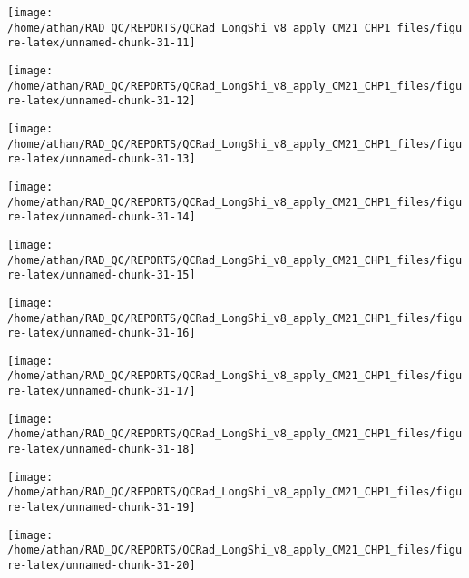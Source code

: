\documentclass[
  10pt,
  a4paper,oneside]{article}
\begin{document}
\begin{center}\texttt{[image: /home/athan/RAD\_QC/REPORTS/QCRad\_LongShi\_v8\_apply\_CM21\_CHP1\_files/figure-latex/unnamed-chunk-31-11]} \end{center}

\begin{center}\texttt{[image: /home/athan/RAD\_QC/REPORTS/QCRad\_LongShi\_v8\_apply\_CM21\_CHP1\_files/figure-latex/unnamed-chunk-31-12]} \end{center}

\begin{center}\texttt{[image: /home/athan/RAD\_QC/REPORTS/QCRad\_LongShi\_v8\_apply\_CM21\_CHP1\_files/figure-latex/unnamed-chunk-31-13]} \end{center}

\begin{center}\texttt{[image: /home/athan/RAD\_QC/REPORTS/QCRad\_LongShi\_v8\_apply\_CM21\_CHP1\_files/figure-latex/unnamed-chunk-31-14]} \end{center}

\begin{center}\texttt{[image: /home/athan/RAD\_QC/REPORTS/QCRad\_LongShi\_v8\_apply\_CM21\_CHP1\_files/figure-latex/unnamed-chunk-31-15]} \end{center}

\begin{center}\texttt{[image: /home/athan/RAD\_QC/REPORTS/QCRad\_LongShi\_v8\_apply\_CM21\_CHP1\_files/figure-latex/unnamed-chunk-31-16]} \end{center}

\begin{center}\texttt{[image: /home/athan/RAD\_QC/REPORTS/QCRad\_LongShi\_v8\_apply\_CM21\_CHP1\_files/figure-latex/unnamed-chunk-31-17]} \end{center}

\begin{center}\texttt{[image: /home/athan/RAD\_QC/REPORTS/QCRad\_LongShi\_v8\_apply\_CM21\_CHP1\_files/figure-latex/unnamed-chunk-31-18]} \end{center}

\begin{center}\texttt{[image: /home/athan/RAD\_QC/REPORTS/QCRad\_LongShi\_v8\_apply\_CM21\_CHP1\_files/figure-latex/unnamed-chunk-31-19]} \end{center}

\begin{center}\texttt{[image: /home/athan/RAD\_QC/REPORTS/QCRad\_LongShi\_v8\_apply\_CM21\_CHP1\_files/figure-latex/unnamed-chunk-31-20]} \end{center}
\end{document}
